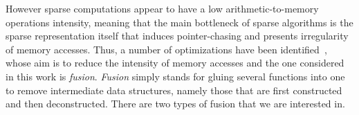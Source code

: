 \documentclass[10pt,conference]{IEEEtran}
\begin{document}

However sparse computations appear to have a low arithmetic-to-memory operations intensity, meaning that the main bottleneck of sparse algorithms is the sparse representation itself that induces pointer-chasing and presents irregularity of memory accesses.
Thus, a number of optimizations have been identified~\cite{yang2020graphblast}, whose aim is to reduce the intensity of memory accesses and the one considered in this work is \emph{fusion}. \emph{Fusion} simply stands for gluing several functions into one to remove intermediate data structures, namely those that are first constructed and then deconstructed.
There are two types of fusion that we are interested in.
\end{document}
